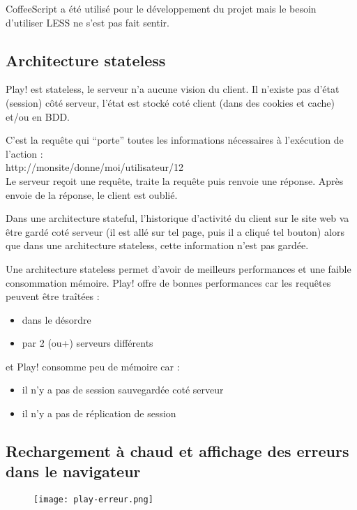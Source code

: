 \bigskip

CoffeeScript a été utilisé pour le développement du projet mais le besoin
d'utiliser LESS ne s'est pas fait sentir.

\subsection{Architecture stateless}

Play! est stateless, le serveur n'a aucune vision du client.
Il n'existe pas d'état (session) côté serveur, l'état est stocké coté client (dans
des cookies et cache) et/ou en BDD.
\bigskip

C'est la requête qui ``porte'' toutes les informations nécessaires à l'exécution
de l'action :\\
http://monsite/donne/moi/utilisateur/12 \\
Le serveur reçoit une requête, traite la requête puis renvoie une réponse.
Après envoie de la réponse, le client est oublié.

Dans une architecture stateful, l'historique d'activité du client sur le site
web va être gardé coté serveur (il est allé sur tel page, puis il a cliqué tel
bouton) alors que dans une architecture stateless, cette information n'est pas
gardée.

Une architecture stateless permet d'avoir de meilleurs performances et une
faible consommation mémoire. Play! offre de bonnes performances car les requêtes
peuvent être traîtées : 
\begin{itemize}
\item dans le désordre
\item par 2 (ou+) serveurs différents
\end{itemize}
et Play! consomme peu de mémoire car :
\begin{itemize}
\item il n'y a pas de session sauvegardée coté serveur
\item il n'y a pas de réplication de session
\end{itemize}

\subsection{Rechargement à chaud et affichage des erreurs dans le navigateur}

\begin{figure}[H]
  \texttt{[image: play-erreur.png]}  
\end{figure}

